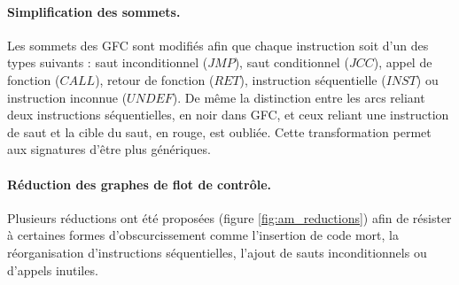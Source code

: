 \paragraph{Simplification des sommets.}
Les sommets des GFC sont modifiés afin que chaque instruction soit d'un des types suivants : saut inconditionnel ($JMP$), saut conditionnel ($JCC$), appel de fonction ($CALL$), retour de fonction ($RET$), instruction séquentielle ($INST$) ou instruction inconnue ($UNDEF$). De même la distinction entre les arcs reliant deux instructions séquentielles, en noir dans GFC, et ceux reliant une instruction de saut et la cible du saut, en rouge, est oubliée.
Cette transformation permet aux signatures d'être plus génériques.

\paragraph{Réduction des graphes de flot de contrôle.}
Plusieurs réductions ont été proposées (figure \ref{fig:am_reductions}) afin de résister à certaines formes d'obscurcissement comme l'insertion de code mort, la réorganisation d'instructions séquentielles, l'ajout de sauts inconditionnels ou d'appels inutiles.

